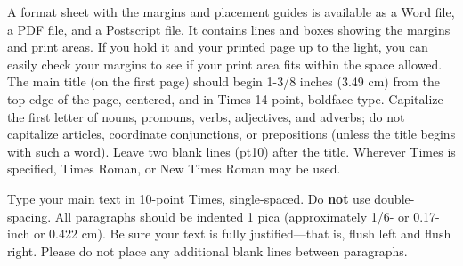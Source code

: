 \documentclass[times, 10pt, twocolumn, a4paper]{article}
\begin{document}
A format sheet with the margins and placement guides is available as a Word file, a PDF file, and a Postscript file. It contains lines and boxes showing the margins and print areas. If you hold it and your printed page up to the light, you can easily check your margins to see if your print area fits within the space allowed.
The main title (on the first page) should begin 1-3/8 inches (3.49 cm) from the top edge of the page, centered, and in Times 14-point, boldface type. Capitalize the first letter of nouns, pronouns, verbs, adjectives, and adverbs; do not capitalize articles, coordinate conjunctions, or prepositions (unless the title begins with such a word). Leave two blank lines (pt10) after the title.
Wherever Times is specified, Times Roman, or New Times Roman may be used.

Type your main text in 10-point Times, single-spaced. Do {\bf not} use double-spacing. All paragraphs should be indented 1 pica (approximately 1/6- or 0.17-inch or 0.422 cm). Be sure your text is fully justified—that is, flush left and flush right. Please do not place any additional blank lines between paragraphs. 
\end{document}

